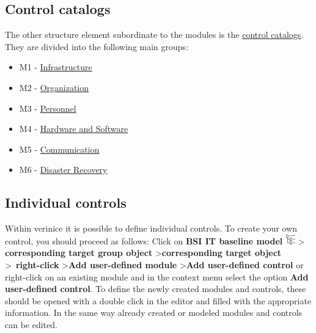 \documentclass[a4paper,10pt]{book}
\begin{document}
\subsection{Control catalogs}
The other structure element subordinate to the modules is the \href{https://www.bsi.bund.de/cln_156/DE/Themen/weitereThemen/ITGrundschutzKataloge/Inhalt/Massnahmenkataloge/massnahmenkataloge_node.html}{control catalogs}. They are divided into the following main groups:
\begin{itemize}
\item M1 - \href{https://www.bsi.bund.de/cln_156/DE/Themen/weitereThemen/ITGrundschutzKataloge/Inhalt/Massnahmenkataloge/M1Infrastruktur/m1infrastruktur_node.html}{Infrastructure}
\item M2 - \href{https://www.bsi.bund.de/cln_156/DE/Themen/weitereThemen/ITGrundschutzKataloge/Inhalt/Massnahmenkataloge/M2Organisation/m2organisation_node.html}{Organization}
\item M3 - \href{https://www.bsi.bund.de/cln_156/DE/Themen/weitereThemen/ITGrundschutzKataloge/Inhalt/Massnahmenkataloge/M3Personal/m3personal_node.html}{Personnel}
\item M4 - \href{https://www.bsi.bund.de/cln_156/DE/Themen/weitereThemen/ITGrundschutzKataloge/Inhalt/Massnahmenkataloge/M4HardwareundSoftware/m4hardwareundsoftware_node.html}{Hardware and Software}
\item M5 - \href{https://www.bsi.bund.de/cln_156/DE/Themen/weitereThemen/ITGrundschutzKataloge/Inhalt/Massnahmenkataloge/M5Kommunikation/m5kommunikation_node.html}{Communication}
\item M6 - \href{https://www.bsi.bund.de/cln_156/DE/Themen/weitereThemen/ITGrundschutzKataloge/Inhalt/Massnahmenkataloge/M6Notfallversorgung/m6notfallvorsorge_node.html}{Disaster Recovery}
\end{itemize}

\subsection{Individual controls}
Within verinice it is possible to define individual controls. To create your own control, you should proceed as follows:
Click on \textbf{BSI IT baseline model} \includegraphics[height=2ex]{Icon/GS_Modell.png} \textgreater
\textbf{corresponding target group object} \textgreater \textbf{corresponding target object} \textgreater\ \textbf{right-click} \textgreater \textbf{Add user-defined module} \textgreater \textbf{Add user-defined control} or right-click on an existing module and in the context menu select the option \textbf{Add user-defined control}.
To define the newly created modules and controls, these should be opened with a double click in the editor and filled with the appropriate information. In the same way already created or modeled modules and controls can be edited.
\end{document}
